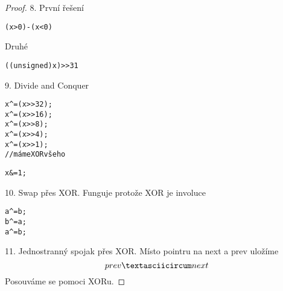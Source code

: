 \begin{proof}
	8. První řešení
	\begin{alltt}
		(x > 0) - (x < 0)
	\end{alltt}
	Druhé
	\begin{alltt}
		((unsigned)x) >> 31
	\end{alltt}

	9. Divide and Conquer
	\begin{alltt}
		x ^= (x >> 32);
		x ^= (x >> 16);
		x ^= (x >> 8);
		x ^= (x >> 4);
		x ^= (x >> 1);
		// máme XOR všeho

		x \&= 1;
	\end{alltt}

	10. Swap přes XOR. Funguje protože XOR je involuce
	\begin{alltt}
		a ^= b;
		b ^= a;
		a ^= b;
	\end{alltt}

	11. Jednostranný spojak přes XOR.
	Místo pointru na next a prev uložíme
	\[ prev \textasciicircum next \]
	Posouváme se pomoci XORu.
\end{proof}
